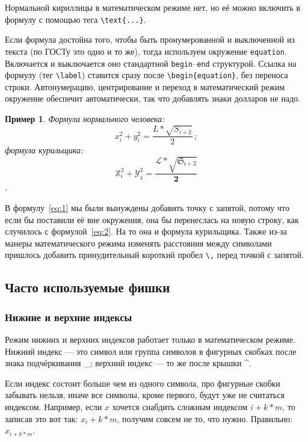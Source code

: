 \documentclass[14pt, russian]{scrartcl}
\newcounter{cExample}
\newtheorem{Example}{Пример}[cExample]
\begin{document}
Нормальной кириллицы в математическом режиме нет, но её можно включить в формулу с помощью тега \texttt{\textbackslash text\{...\}}. 

Если формула достойна того, чтобы быть пронумерованной и выключенной из текста (по ГОСТу это одно и то же), тогда используем окружение \texttt{equation}. Включается и выключается оно стандартной \texttt{begin}--\texttt{end} структурой. Ссылка на формулу (тег \texttt{\textbackslash label}) ставится сразу после \texttt{\textbackslash begin\{equation\}}, без переноса строки. Автонумерацию, центрирование и переход в математический режим окружение обеспечит автоматически, так что добавлять знаки долларов не надо.

\begin{Example}\label{Example:MathFont2}
Формула нормального человека: 
\begin{equation}\label{eq:1}
x_i^2 + y^2_i = \frac{L*\sqrt{S_{i+2}}}{2}\,;
\end{equation} 
формула курильщика: 
\begin{equation}\label{eq:2}
\mathbb{X}_\mathfrak{i}^\mathfrak{2} + \mathcal{Y}^\mathit{2}_\mathtt{i} = \frac{\mathscr{L}*\sqrt{\mathfrak{S}_\mathfrak{i+2}}}{\mathbf{2}}
\end{equation}.
\end{Example} 

В формулу~\ref{eq:1} мы были вынуждены добавить точку с запятой, потому что если бы поставили её вне окружения, она бы перенеслась на новую строку, как случилось с формулой~\ref{eq:2}. На то она и формула курильщика. Также из-за манеры математического режима изменять расстояния между символами пришлось добавить принудительный короткий пробел \texttt{\textbackslash ,} перед точкой с запятой. 

\subsection{Часто используемые фишки}
\subsubsection{Нижние и верхние индексы}

Режим нижних и верхних индексов работает только в математическом режиме. Нижний индекс --- это символ или группа символов в фигурных скобках после знака подчёркивания \_; верхний индекс --- то же после крышки \^{}.

Если индекс состоит больше чем из одного символа, про фигурные скобки забывать нельзя, иначе все символы, кроме первого, будут уже не считаться индексом. Например, если $x$ хочется снабдить сложным индексом $i+k*m$, то записав это вот так: $x_i+k*m$, получим совсем не то, что нужно. Правильно: $x_{i+k*m}$.
\end{document}
